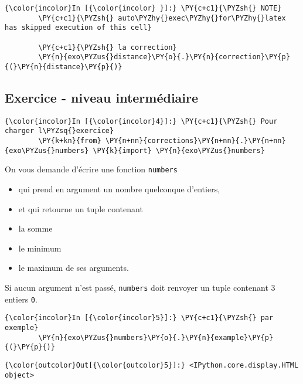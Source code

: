     \begin{Verbatim}[commandchars=\\\{\}]
{\color{incolor}In [{\color{incolor} }]:} \PY{c+c1}{\PYZsh{} NOTE}
        \PY{c+c1}{\PYZsh{} auto\PYZhy{}exec\PYZhy{}for\PYZhy{}latex has skipped execution of this cell}
        
        \PY{c+c1}{\PYZsh{} la correction}
        \PY{n}{exo\PYZus{}distance}\PY{o}{.}\PY{n}{correction}\PY{p}{(}\PY{n}{distance}\PY{p}{)}
\end{Verbatim}


    \hypertarget{exercice---niveau-intermuxe9diaire}{%
\subsection{Exercice - niveau
intermédiaire}\label{exercice---niveau-intermuxe9diaire}}

    \begin{Verbatim}[commandchars=\\\{\}]
{\color{incolor}In [{\color{incolor}4}]:} \PY{c+c1}{\PYZsh{} Pour charger l\PYZsq{}exercice}
        \PY{k+kn}{from} \PY{n+nn}{corrections}\PY{n+nn}{.}\PY{n+nn}{exo\PYZus{}numbers} \PY{k}{import} \PY{n}{exo\PYZus{}numbers}
\end{Verbatim}


    On vous demande d'écrire une fonction \texttt{numbers}

\begin{itemize}
\tightlist
\item
  qui prend en argument un nombre quelconque d'entiers,
\item
  et qui retourne un tuple contenant
\item
  la somme
\item
  le minimum
\item
  le maximum de ses arguments.
\end{itemize}

    Si aucun argument n'est passé, \texttt{numbers} doit renvoyer un tuple
contenant 3 entiers \texttt{0}.

    \begin{Verbatim}[commandchars=\\\{\}]
{\color{incolor}In [{\color{incolor}5}]:} \PY{c+c1}{\PYZsh{} par exemple}
        \PY{n}{exo\PYZus{}numbers}\PY{o}{.}\PY{n}{example}\PY{p}{(}\PY{p}{)}
\end{Verbatim}


\begin{Verbatim}[commandchars=\\\{\}]
{\color{outcolor}Out[{\color{outcolor}5}]:} <IPython.core.display.HTML object>
\end{Verbatim}
            
